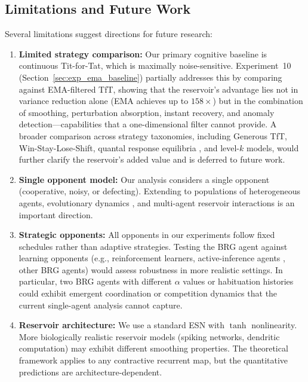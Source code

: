 \documentclass[11pt,a4paper]{article}
\theoremstyle{definition}
\begin{document}
\subsection{Limitations and Future Work}
\label{sec:limitations}

Several limitations suggest directions for future research:

\begin{enumerate}[label=(\roman*)]
  \item \textbf{Limited strategy comparison:}
    Our primary cognitive baseline is continuous Tit-for-Tat, which is
    maximally noise-sensitive.  Experiment~10
    (Section~\ref{sec:exp_ema_baseline}) partially addresses this by
    comparing against EMA-filtered TfT, showing that the reservoir's
    advantage lies not in variance reduction alone (EMA achieves up to
    $158\times$) but in the combination of smoothing, perturbation
    absorption, instant recovery, and anomaly detection---capabilities
    that a one-dimensional filter cannot provide.
    A broader comparison across strategy taxonomies, including Generous
    TfT, Win-Stay-Lose-Shift, quantal response equilibria
    \citep{mckelvey1995}, and level-$k$ models, would further clarify the
    reservoir's added value and is deferred to future work.

  \item \textbf{Single opponent model:}  Our analysis considers a single
    opponent (cooperative, noisy, or defecting).  Extending to populations
    of heterogeneous agents, evolutionary dynamics
    \citep{nowak2006, kandori1993}, and multi-agent reservoir interactions
    is an important direction.

  \item \textbf{Strategic opponents:}  All opponents in our experiments
    follow fixed schedules rather than adaptive strategies.  Testing the
    BRG agent against learning opponents (e.g., reinforcement learners,
    active-inference agents \citep{demekas2024},
    other BRG agents) would assess robustness in more realistic settings.
    In particular, two BRG agents with different $\alpha$ values or
    habituation histories could exhibit emergent coordination or
    competition dynamics that the current single-agent analysis cannot
    capture.

  \item \textbf{Reservoir architecture:}  We use a standard ESN with $\tanh$
    nonlinearity.  More biologically realistic reservoir models (spiking
    networks, dendritic computation) may exhibit different smoothing
    properties.  The theoretical framework applies to any contractive
    recurrent map, but the quantitative predictions are architecture-dependent.


\end{enumerate}
\end{document}
